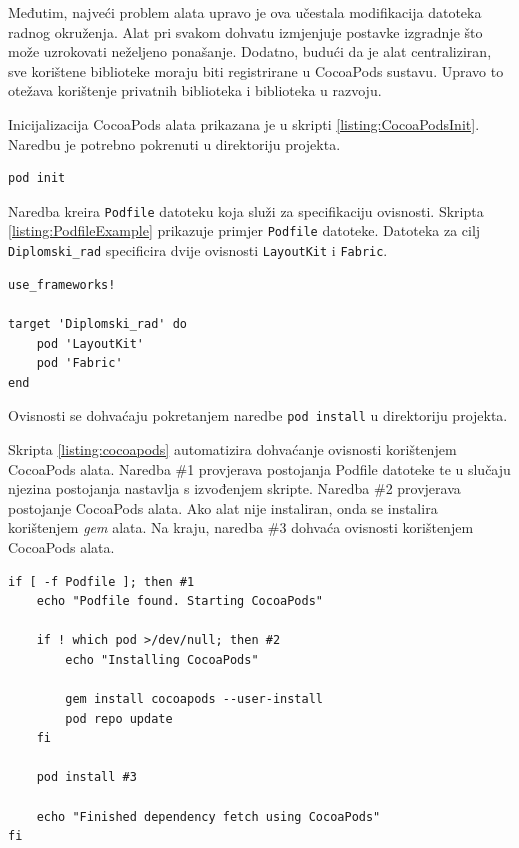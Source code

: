 \documentclass[times, utf8, diplomski, numeric]{fer}
\begin{document}
Međutim, najveći problem alata upravo je ova učestala modifikacija datoteka radnog okruženja. Alat pri svakom dohvatu izmjenjuje postavke izgradnje što može uzrokovati neželjeno ponašanje. Dodatno, budući da je alat centraliziran, sve korištene biblioteke moraju biti registrirane u CocoaPods sustavu. Upravo to otežava korištenje privatnih biblioteka i biblioteka u razvoju.

Inicijalizacija CocoaPods alata prikazana je u skripti \ref{listing:CocoaPodsInit}. Naredbu je potrebno pokrenuti u direktoriju projekta.

\begin{lstlisting}[caption=Inicijalizacija CocoaPods alata, label=listing:CocoaPodsInit]
pod init
\end{lstlisting}

Naredba kreira \verb|Podfile| datoteku koja služi za specifikaciju ovisnosti. Skripta \ref{listing:PodfileExample} prikazuje primjer \verb|Podfile| datoteke. Datoteka za cilj \verb|Diplomski_rad| specificira dvije ovisnosti \verb|LayoutKit| i \verb|Fabric|.

\begin{lstlisting}[caption=Primjer Podfile datoteke, label=listing:PodfileExample]
use_frameworks!

target 'Diplomski_rad' do
    pod 'LayoutKit'
    pod 'Fabric'
end
\end{lstlisting}

Ovisnosti se dohvaćaju pokretanjem naredbe \verb|pod install| u direktoriju projekta.

Skripta \ref{listing:cocoapods} automatizira dohvaćanje ovisnosti korištenjem CocoaPods alata. Naredba \#1 provjerava postojanja Podfile datoteke te u slučaju njezina postojanja nastavlja s izvođenjem skripte. Naredba \#2 provjerava postojanje CocoaPods alata. Ako alat nije instaliran, onda se instalira korištenjem \textit{gem} alata. Na kraju, naredba \#3 dohvaća ovisnosti korištenjem CocoaPods alata.

\begin{lstlisting}[caption=Dohvat ovisnosti korištenjem alata CocoaPods, label=listing:cocoapods]
if [ -f Podfile ]; then #1
    echo "Podfile found. Starting CocoaPods"

    if ! which pod >/dev/null; then #2
        echo "Installing CocoaPods"

        gem install cocoapods --user-install
        pod repo update
    fi

    pod install #3

    echo "Finished dependency fetch using CocoaPods"
fi
\end{lstlisting}
\end{document}
